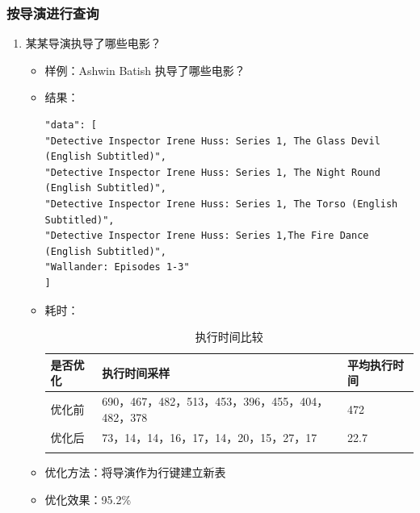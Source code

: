 \documentclass{ctexrep}
\begin{document}
	\subsubsection{按导演进行查询}
	    \begin{enumerate}
	        \item 某某导演执导了哪些电影？
    	        \begin{itemize}
    	            \item 样例：Ashwin Batish 执导了哪些电影？
    	            \item 结果：
						\begin{lstlisting}
"data": [
"Detective Inspector Irene Huss: Series 1, The Glass Devil (English Subtitled)",
"Detective Inspector Irene Huss: Series 1, The Night Round (English Subtitled)",
"Detective Inspector Irene Huss: Series 1, The Torso (English     Subtitled)",
"Detective Inspector Irene Huss: Series 1,The Fire Dance (English Subtitled)",
"Wallander: Episodes 1-3"
]
    	                \end{lstlisting}
    	            \item 耗时：
    	                \begin{longtable}{l|p{5cm}|l}
    	                    \hline
    	                    是否优化 & 执行时间采样 & 平均执行时间\\
    	                    \hline
    	                    \hline
    	                    优化前 & 690，467，482，513，453，396，455，404，482，378 & 472\\
    	                    优化后 & 73，14，14，16，17，14，20，15，27，17 & 22.7\\
    	                    \hline
    	                    \caption{执行时间比较}
    	                \end{longtable}
    	            \item 优化方法：将导演作为行键建立新表
    	            \item 优化效果：95.2\%
    	        \end{itemize}
	    \end{enumerate}
\end{document}
